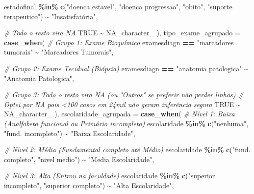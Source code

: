 \documentclass[
]{article}
\newenvironment{Shaded}{\begin{snugshade}}{\end{snugshade}}
\newcommand{\AttributeTok}[1]{\textcolor[rgb]{0.13,0.29,0.53}{#1}}
\newcommand{\CommentTok}[1]{\textcolor[rgb]{0.56,0.35,0.01}{\textit{#1}}}
\newcommand{\ConstantTok}[1]{\textcolor[rgb]{0.56,0.35,0.01}{#1}}
\newcommand{\FunctionTok}[1]{\textcolor[rgb]{0.13,0.29,0.53}{\textbf{#1}}}
\newcommand{\NormalTok}[1]{#1}
\newcommand{\SpecialCharTok}[1]{\textcolor[rgb]{0.81,0.36,0.00}{\textbf{#1}}}
\newcommand{\StringTok}[1]{\textcolor[rgb]{0.31,0.60,0.02}{#1}}
\begin{document}
\begin{Shaded}
\begin{Highlighting}[]
\NormalTok{      estadofinal }\SpecialCharTok{\%in\%} \FunctionTok{c}\NormalTok{(}\StringTok{"doenca estavel"}\NormalTok{, }\StringTok{"doenca progressao"}\NormalTok{, }
                         \StringTok{"obito"}\NormalTok{, }\StringTok{"suporte terapeutico"}\NormalTok{) }\SpecialCharTok{\textasciitilde{}} \StringTok{"Insatisfatória"}\NormalTok{,}
      
      \CommentTok{\# Todo o resto vira NA}
      \ConstantTok{TRUE} \SpecialCharTok{\textasciitilde{}} \ConstantTok{NA\_character\_} 
\NormalTok{    ),}
    \AttributeTok{tipo\_exame\_agrupado =} \FunctionTok{case\_when}\NormalTok{(}
      \CommentTok{\# Grupo 1: Exame Bioquímico}
\NormalTok{      examesdiagn }\SpecialCharTok{==} \StringTok{"marcadores tumorais"} \SpecialCharTok{\textasciitilde{}} \StringTok{"Marcadores Tumorais"}\NormalTok{,}
      
      \CommentTok{\# Grupo 2: Exame Tecidual (Biópsia)}
\NormalTok{      examesdiagn }\SpecialCharTok{==} \StringTok{"anatomia patologica"} \SpecialCharTok{\textasciitilde{}} \StringTok{"Anatomia Patologica"}\NormalTok{,}
      
      \CommentTok{\# Grupo 3: Todo o resto vira NA (ou "Outros" se preferir não perder linhas)}
      \CommentTok{\# Optei por NA pois \textless{}100 casos em 24mil não geram inferência segura}
      \ConstantTok{TRUE} \SpecialCharTok{\textasciitilde{}} \ConstantTok{NA\_character\_} 
\NormalTok{    ),}
    \AttributeTok{escolaridade\_agrupada =} \FunctionTok{case\_when}\NormalTok{(}
      \CommentTok{\# Nível 1: Baixa (Analfabeto funcional ou Primário incompleto)}
\NormalTok{      escolaridade }\SpecialCharTok{\%in\%} \FunctionTok{c}\NormalTok{(}\StringTok{"nenhuma"}\NormalTok{, }\StringTok{"fund. incompleto"}\NormalTok{) }\SpecialCharTok{\textasciitilde{}} \StringTok{"Baixa Escolaridade"}\NormalTok{,}
      
      \CommentTok{\# Nível 2: Média (Fundamental completo até Médio)}
\NormalTok{      escolaridade }\SpecialCharTok{\%in\%} \FunctionTok{c}\NormalTok{(}\StringTok{"fund. completo"}\NormalTok{, }\StringTok{"nivel medio"}\NormalTok{) }\SpecialCharTok{\textasciitilde{}} \StringTok{"Media Escolaridade"}\NormalTok{,}
      
      \CommentTok{\# Nível 3: Alta (Entrou na faculdade)}
\NormalTok{      escolaridade }\SpecialCharTok{\%in\%} \FunctionTok{c}\NormalTok{(}\StringTok{"superior incompleto"}\NormalTok{, }\StringTok{"superior completo"}\NormalTok{) }\SpecialCharTok{\textasciitilde{}} \StringTok{"Alta Escolaridade"}\NormalTok{,}
      

\end{Highlighting}
\end{Shaded}
\end{document}
